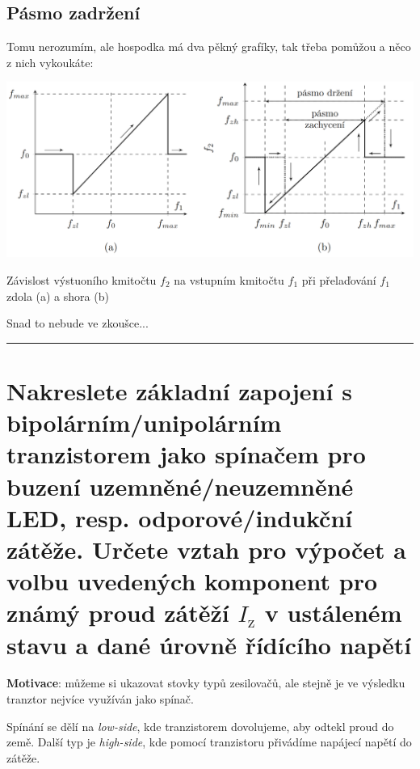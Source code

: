 \documentclass[a4paper,12pt]{article}   %
\begin{document}
\subsection*{Pásmo zadržení}
Tomu nerozumím, ale hospodka má dva pěkný grafíky, tak třeba pomůžou a něco z nich vykoukáte:
\begin{graf}[h!]
    \centering
    \includegraphics[width=\textwidth]{pasmo_zadrzeni.PNG}
    \caption{Závislost výstuoního kmitočtu $f_2$ na vstupním kmitočtu $f_1$ při přelaďování $f_1$ zdola (a) a shora (b)}
    \label{graf:pasmo:zadrzeni}
\end{graf}

Snad to nebude ve zkoušce...
 \\






\hrule%
\section{Nakreslete základní zapojení s bipolárním/unipolárním tranzistorem jako spínačem pro buzení uzemněné/neuzemněné LED, resp. odporové/indukční zátěže. Určete vztah pro výpočet a volbu uvedených komponent pro známý proud zátěží $I_\text{z}$ v ustáleném stavu a dané úrovně řídícího napětí}
\textbf{Motivace}: můžeme si ukazovat stovky typů zesilovačů, ale stejně je ve výsledku tranztor nejvíce využíván jako spínač. 

Spínání se dělí na \textit{low-side}, kde tranzistorem dovolujeme, aby odtekl proud do země. Další typ je \textit{high-side}, kde pomocí tranzistoru přivádíme napájecí napětí do zátěže.
\end{document}
